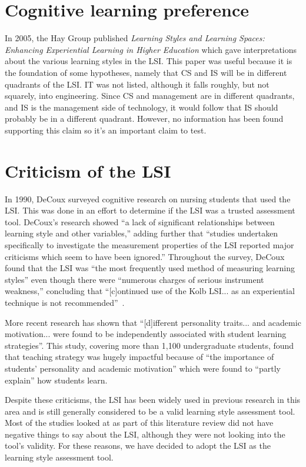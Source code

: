 \section{Cognitive learning preference}
In 2005, the Hay Group published \textit{Learning Styles and Learning Spaces: Enhancing Experiential Learning in Higher Education} which gave interpretations about the various learning styles in the LSI. This paper was useful because it is the foundation of some hypotheses, namely that CS and IS will be in different quadrants of the LSI. IT was not listed, although it falls roughly, but not squarely, into engineering. Since CS and management are in different quadrants, and IS is the management side of technology, it would follow that IS should probably be in a different quadrant. However, no information has been found supporting this claim so it's an important claim to test.

\section{Criticism of the LSI}
In 1990, DeCoux surveyed cognitive research on nursing students that used the LSI. This was done in an effort to determine if the LSI was a trusted assessment tool. DeCoux's research showed ``a lack of significant relationships between learning style and other variables,'' adding further that ``studies undertaken specifically to investigate the measurement properties of the LSI reported major criticisms which seem to have been ignored.'' Throughout the survey, DeCoux found that the LSI was ``the most frequently used method of measuring learning styles'' even though there were ``numerous charges of serious instrument weakness,'' concluding that ``[c]ontinued use of the Kolb LSI... as an experiential technique is not recommended''~\citep{decoux2016}.

More recent research has shown that ``[d]ifferent personality traits... and academic motivation... were found to be independently associated with student learning strategies''\cite{donche2013}. This study, covering more than 1,100 undergraduate students, found that teaching strategy was hugely impactful because of ``the importance of students' personality and academic motivation'' which were found to ``partly explain'' how students learn.

Despite these criticisms, the LSI has been widely used in previous research in this area and is still generally considered to be a valid learning style assessment tool. Most of the studies looked at as part of this literature review did not have negative things to say about the LSI, although they were not looking into the tool's validity. For these reasons, we have decided to adopt the LSI as the learning style assessment tool.

